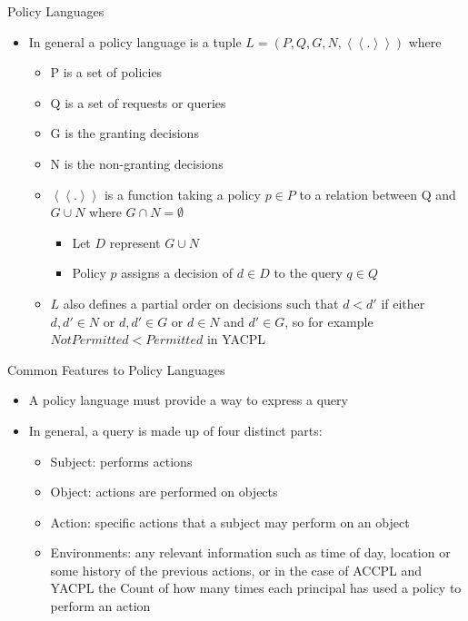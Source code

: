 \documentclass{beamer}
\begin{document}
\begin{frame}[fragile]{Policy Languages}
\begin{itemize}
\item In general a policy language is a tuple $L = (P, Q, G, N, \left\langle\left\langle . \right\rangle\right\rangle)$ where
    \begin{itemize}
        \item P is a set of policies
        \item Q is a set of requests or queries
        \item G is the granting decisions
         \item N is the non-granting decisions
         \item $\left\langle\left\langle . \right\rangle\right\rangle$ is a function taking a policy $p \in P$ to a relation between Q and $G \cup N$ where $G \cap N = \emptyset$
               \begin{itemize}
                    \item Let $D$ represent $G \cup N$ 
                    \item Policy $p$ assigns a decision of $d \in D$ to the query $q \in Q$
                \end{itemize}
          \item $L$ also defines a partial order on decisions such that $d < d'$ if either $d, d' \in N$ or $d, d' \in G$ or $d \in N$ and $d' \in G$, so for example $NotPermitted < Permitted$ in YACPL
    \end{itemize}
\end{itemize}
\end{frame}
\begin{frame}[fragile]{Common Features to Policy Languages}
\begin{itemize}
\item A policy language must provide a way to express a query
\item In general, a query is made up of four distinct parts:
   \begin{itemize}
       \item Subject: performs actions
       \item Object: actions are performed on objects
       \item Action: specific actions that a subject may perform on an object
       \item Environments: any relevant information such as time of day, location or some history of the previous actions, or in the case of ACCPL and YACPL the Count of how many times each principal has used a policy to perform an action
       \end{itemize}
\end{itemize}
\end{frame}
\end{document}

